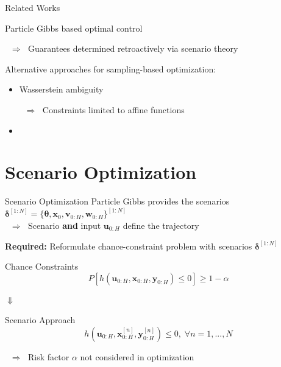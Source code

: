 \documentclass[student, noshadow, itr, english, aspectratio=169]{ITR_LSR_slides}
\begin{document}
\begin{frame}{Related Works}

Particle Gibbs based optimal control \textbf{\cite{Robert_24}}

$\;\; \Rightarrow \;$ Guarantees determined retroactively via scenario theory

\vspace{.4cm}

Alternative approaches for sampling-based optimization:
\begin{itemize}
\item Wasserstein ambiguity \cite{Hota_19}

$\;\; \Rightarrow \;$ Constraints limited to affine functions
\item {} \textbf{\cite{Yassine_22}}\\
\makebox[3cm]{\hfill}   \cite{Adam_22} 
\end{itemize}
\end{frame}


\section{Scenario Optimization}

\begin{frame}{Scenario Optimization}
Particle Gibbs provides the scenarios $\boldsymbol{\delta}^{[1:N]} = \{ \boldsymbol{\theta}, \boldsymbol{x}_0, \boldsymbol{v}_{0:H}, \boldsymbol{w}_{0:H}\}^{[1:N]}$\\

$\;\; \Rightarrow \;$ Scenario \textbf{and} input $\boldsymbol{u}_{0:H}$ define the trajectory

\textbf{Required:} Reformulate chance-constraint problem with scenarios $\boldsymbol{\delta}^{[1:N]}$

\begin{block}{Chance Constraints}
	\begin{equation*}
		P \left[ h(\boldsymbol{u}_{0:H},  \boldsymbol{x}_{0:H},  \boldsymbol{y}_{0:H}) \leq 0 \right] \geq 1 - \alpha
	\end{equation*}
\end{block}	

\makebox[6.7cm]{\hfill} $\boldsymbol{\Downarrow}$ 

\begin{block}{Scenario Approach \cite{Robert_24}}
	\begin{equation*}
		 h(\boldsymbol{u}_{0:H},  \boldsymbol{x}_{0:H}^{[n]},  \boldsymbol{y}_{0:H}^{[n]}) \leq 0, \; \forall n = 1, ..., N
	\end{equation*}
\end{block}

$\;\; \Rightarrow \;$ Risk factor $\alpha$ not considered in optimization



\end{frame}
\end{document}
